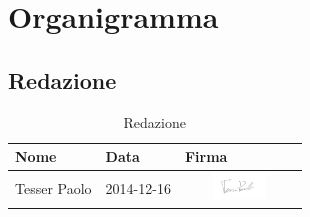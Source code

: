 %

\appendix

\section{Organigramma} %
\label{sec:organigramma}
	\subsection{Redazione} %
	\label{sub:redazione}
		\begin{table}[!h]
			\begin{center}
				\begin{tabularx}{0.8\textwidth}{|X|X|X|}
					\hline
					\textbf{Nome} & \textbf{Data} & \textbf{Firma} \\
					\hline
					\rule[-4mm]{0mm}{1cm}
					Tesser Paolo &
					2014-12-16 &
					\includegraphics[height=0.7cm,width=2.9cm]{./images/firme/paolo.png} \\
					\hline
				\end{tabularx}
			\end{center}
		\caption{Redazione}
		\end{table}
	
